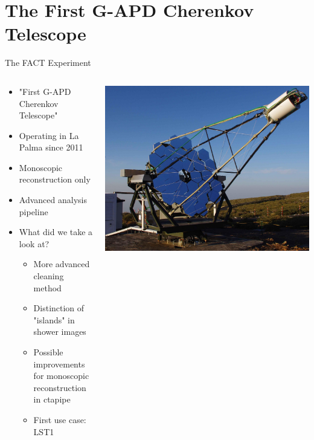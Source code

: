 \section{The First G-APD Cherenkov Telescope}

\begin{frame}{The FACT Experiment}
    \begin{columns}[T] %
        \begin{column}{.45\textwidth}
            \vspace{10pt}
            \begin{itemize}
                \item "First G-APD Cherenkov Telescope"
                \item Operating in La Palma since 2011
                \item Monoscopic reconstruction only
                \item Advanced analysis pipeline
                \item What did we take a look at?
                \begin{itemize}
                    \item{More advanced cleaning method}
                    \item{Distinction of "islands" in shower images}
                    \item[\rightarrow] Possible improvements for monoscopic reconstruction in ctapipe
                    \item[\rightarrow] First use case: LST1
                \end{itemize}
            \end{itemize}
        \end{column}
        \begin{column}{.48\textwidth}
            \includegraphics[width=\linewidth]{images/fact_telescope.jpg}
            \cite{Anderhub_2013}
        \end{column}
    \end{columns}
\end{frame}